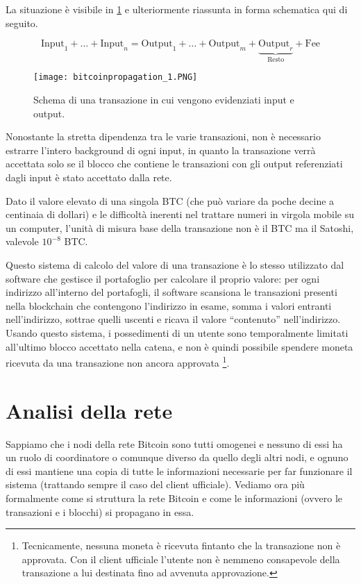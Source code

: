 La situazione è visibile in \ref{bitcoinpropagation_1} e ulteriormente riassunta in forma schematica qui di seguito.

$$ \text{Input}_1 + \dots + \text{Input}_n = \text{Output}_1 + \dots + \text{Output}_m + \underbrace{\text{Output}_r}_\text{Resto} + \text{Fee}$$

\begin{figure}[htbp]
\centering
\texttt{[image: bitcoinpropagation\_1.PNG]}
\caption[Schema di transazione]{Schema di una transazione in cui vengono evidenziati input e output.\label{bitcoinpropagation_1}}
\end{figure}

Nonostante la stretta dipendenza tra le varie transazioni, non è necessario estrarre l'intero background di ogni input, in quanto la transazione verrà accettata solo se il blocco che contiene le transazioni con gli output referenziati dagli input è stato accettato dalla rete.

Dato il valore elevato di una singola BTC (che può variare da poche decine a centinaia di dollari) e le difficoltà inerenti nel trattare numeri in virgola mobile su un computer, l'unità di misura base della transazione non è il BTC ma il Satoshi, valevole $10^{-8}$ BTC.

Questo sistema di calcolo del valore di una transazione è lo stesso utilizzato dal software che gestisce il portafoglio per calcolare il proprio valore: per ogni indirizzo all'interno del portafogli, il software scansiona le transazioni presenti nella blockchain che contengono l'indirizzo in esame, somma i valori entranti nell'indirizzo, sottrae quelli uscenti e ricava il valore ``contenuto'' nell'indirizzo. Usando questo sistema, i possedimenti di un utente sono temporalmente limitati all'ultimo blocco accettato nella catena, e non è quindi possibile spendere moneta ricevuta da una transazione non ancora approvata \footnote{Tecnicamente, nessuna moneta è ricevuta fintanto   che la transazione non è approvata. Con il client ufficiale l'utente non è nemmeno consapevole   della transazione a lui destinata fino ad avvenuta approvazione.}.

\section{Analisi della rete}\label{analisi-della-rete}

Sappiamo che i nodi della rete Bitcoin sono tutti omogenei e nessuno di essi ha un ruolo di coordinatore o comunque diverso da quello degli altri nodi, e ognuno di essi mantiene una copia di tutte le informazioni necessarie per far funzionare il sistema (trattando sempre il caso del client ufficiale). Vediamo ora più formalmente come si struttura la rete Bitcoin e come le informazioni (ovvero le transazioni e i blocchi) si propagano in essa.

